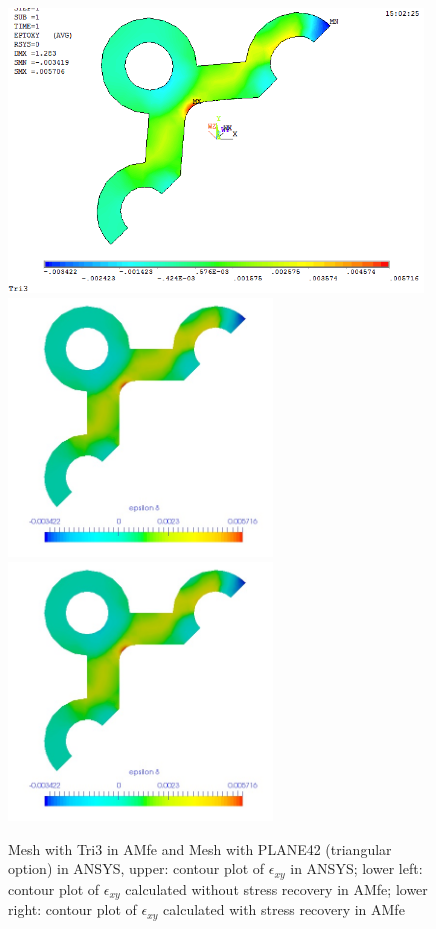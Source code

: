 \begin{figure}[htbp]
	\begin{center}
		\includegraphics[width=11cm,clip]{TTri3_Exy.png} 
		\includegraphics[width=7cm,clip]{TTri3_Exy_PD.png} 		
		\includegraphics[width=7cm,clip]{TTri3_Exy_P.png} 		
		\caption{Mesh with Tri3 in AMfe and Mesh with PLANE42 (triangular option) in ANSYS, upper: contour plot of $\epsilon_{xy}$ in ANSYS; lower left: contour plot of $\epsilon_{xy}$ calculated without stress recovery in AMfe; lower right: contour plot of $\epsilon_{xy}$ calculated with stress recovery in AMfe} \label{fig: Tri3_Exy}
	\end{center}
\end{figure}
\clearpage 

